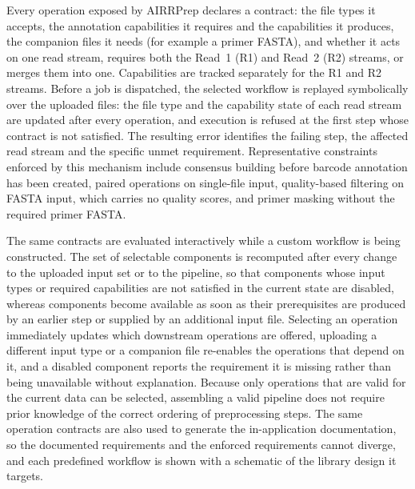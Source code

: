 \documentclass[11pt]{article}
\begin{document}
Every operation exposed by AIRRPrep declares a contract: the file types it
accepts, the annotation capabilities it requires and the capabilities it
produces, the companion files it needs (for example a primer FASTA), and
whether it acts on one read stream, requires both the Read~1 (R1) and Read~2
(R2) streams, or merges them into one. Capabilities are tracked separately for
the R1 and R2 streams. Before a job is dispatched, the selected workflow is
replayed symbolically over the uploaded files: the file type and the capability
state of each read stream are updated after every operation, and execution is
refused at the first step whose contract is not satisfied. The resulting error
identifies the failing step, the affected read stream and the specific unmet
requirement. Representative constraints enforced by this mechanism include
consensus building before barcode annotation has been created, paired
operations on single-file input, quality-based filtering on FASTA input, which
carries no quality scores, and primer masking without the required primer
FASTA.

The same contracts are evaluated interactively while a custom workflow is being
constructed. The set of selectable components is recomputed after every change
to the uploaded input set or to the pipeline, so that components whose input
types or required capabilities are not satisfied in the current state are
disabled, whereas components become available as soon as their prerequisites
are produced by an earlier step or supplied by an additional input file.
Selecting an operation immediately updates which downstream operations are
offered, uploading a different input type or a companion file re-enables the
operations that depend on it, and a disabled component reports the requirement
it is missing rather than being unavailable without explanation. Because only
operations that are valid for the current data can be selected, assembling a
valid pipeline does not require prior knowledge of the correct ordering of
preprocessing steps. The same operation contracts are also used to generate the
in-application documentation, so the documented requirements and the enforced
requirements cannot diverge, and each predefined workflow is shown with a
schematic of the library design it targets.
\end{document}

